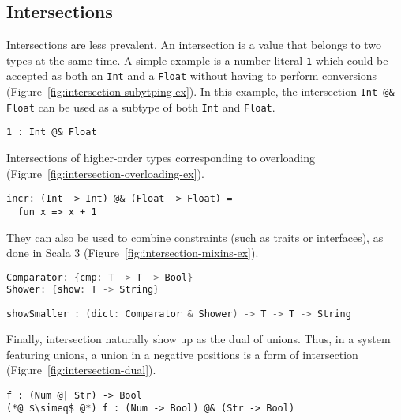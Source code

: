 \documentclass[sigplan,10pt,review,anonymous]{acmart}
\newcommand{\nickel}[1]{\lstinline[language=nickel]{#1}}
\begin{document}
\subsection*{Intersections}

Intersections are less prevalent. An intersection is a value that belongs to
two types at the same time. A simple example is a number literal \nickel{1}
which could be accepted as both an \nickel{Int} and a \nickel{Float} without
having to perform conversions (Figure~\ref{fig:intersection-subytping-ex}). In
this example, the intersection \nickel{Int @& Float} can be used as a subtype of
both \nickel{Int} and \nickel{Float}.

\label{fig:intersection-subytping-ex}
\begin{lstlisting}[title={Value subtyping}]
1 : Int @& Float
\end{lstlisting}

Intersections of higher-order types corresponding to overloading
(Figure~\ref{fig:intersection-overloading-ex}).

\label{fig:intersection-overloading-ex}
\begin{lstlisting}[title={Overloading}]
incr: (Int -> Int) @& (Float -> Float) =
  fun x => x + 1
\end{lstlisting}

They can also be used to combine constraints (such as traits or interfaces), as
done in Scala 3 (Figure~\ref{fig:intersection-mixins-ex}).

\label{fig:intersection-mixins-ex}
\begin{lstlisting}[language=Scala,title={Structural mixins}]
Comparator: {cmp: T -> T -> Bool}
Shower: {show: T -> String}

showSmaller : (dict: Comparator & Shower) -> T -> T -> String
\end{lstlisting}

Finally, intersection naturally show up as the dual of unions. Thus, in a system
featuring unions, a union in a negative positions is a form of intersection
(Figure~\ref{fig:intersection-dual}).

\label{fig:intersection-dual}
\begin{lstlisting}[title={Intersection as the dual of unions}]
f : (Num @| Str) -> Bool
(*@ $\simeq$ @*) f : (Num -> Bool) @& (Str -> Bool)
\end{lstlisting}

\end{document}

